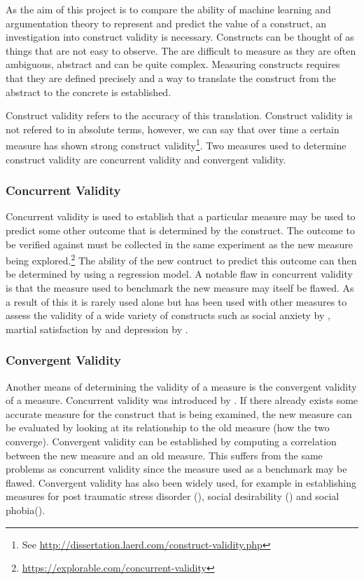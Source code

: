 As the aim of this project is to compare the ability of machine learning and argumentation theory to represent and predict the value of a construct, an investigation into construct validity is necessary. Constructs can be thought of as things that are not easy to observe. The are difficult to measure as they are often ambiguous, abstract and can be quite complex. Measuring constructs requires that they are defined precisely and a way to translate the construct from the abstract to the concrete is established.

Construct validity refers to the accuracy of this translation. Construct validity is not refered to in absolute terms, however, we can say that over time a certain measure has shown strong construct validity\footnote{See \url{http://dissertation.laerd.com/construct-validity.php}}. Two measures used to determine construct validity are concurrent validity and convergent validity.

\subsubsection{Concurrent Validity}
Concurrent validity is used to establish that a particular measure may be used to predict some other outcome that is determined by the construct. The outcome to be verified against must be collected in the same experiment as the new measure being explored.\footnote{\url{https://explorable.com/concurrent-validity}} The ability of the new contruct to predict this outcome can then be determined by using a regression model. A notable flaw in concurrent validity is that the measure used to benchmark the new measure may itself be flawed. As a result of this it is rarely used alone but has been used with other measures to assess the validity of a wide variety of constructs such as social anxiety by \cite{la1993social}, martial satisfaction by \cite{schumm1986concurrent} and depression by \cite{storch2004factor}.

\subsubsection{Convergent Validity}
Another means of determining the validity of a measure is the convergent validity of a measure. Concurrent validity was introduced by \cite{campbell1959convergent}. If there already exists some accurate measure for the construct that is being examined, the new measure can be evaluated by looking at its relationship to the old measure (how the two converge). Convergent validity can be established by computing a correlation between the new measure and an old measure. This suffers from the same problems as concurrent validity since the measure used as a benchmark may be flawed. Convergent validity has also been widely used, for example in establishing measures for post traumatic stress disorder (\cite{neal1994convergent}), social desirability (\cite{stober2001social}) and social phobia(\cite{beidel1996assessment}).

